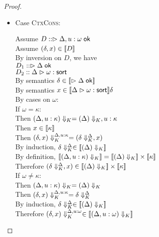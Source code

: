 \begin{proof}
\begin{itemize}
\item Case \textsc{CtxCons}:
  \begin{tabbedproof}
    \oo Assume $D :: \judgeACtx{\Delta, u:\omega}$ \\
    \oo Assume $(\delta, x) \in \interp{D}$ \\
    \ooo By inversion on $D$, we have \\
    \oooo $D_1 :: \judgeACtx{\Delta}$ \\
    \oooo $D_2 :: \judgeSort{\omega}$ \\
    \ooo By semantics $\delta \in \interp{\judgeACtx{\Delta}}$ \\
    \ooo By semantics $x \in \interp{\judgeSort{\omega}}\delta$ \\
    \ooo By cases on $\omega$: \\
    \oooo If $\omega = \kappa$: \\
    \ooooo Then $\restrictkind{\Delta, u:\kappa} = \restrictkind{\Delta}, u:\kappa$ \\
    \ooooo Then $x \in \interp{\kappa}$ \\
    \ooooo Then $\restricttyenv{\Delta, u:\kappa}{(\delta,x)} = 
                (\restricttyenv{\Delta}{\delta}, x)$ \\
    \ooooo By induction, $\restricttyenv{\Delta}{\delta} \in \interp{\restrictkind{\Delta}}$ \\
    \ooooo By definition, $\interp{\restrictkind{\Delta, u:\kappa}} = \interp{\restrictkind{\Delta}} \times \interp{\kappa}$ \\
    \ooooo Therefore $(\restricttyenv{\Delta}{\delta}, x) \in \interp{\restrictkind{\Delta}} \times \interp{\kappa}$ \\
    \oooo If $\omega \not= \kappa$: \\
    \ooooo Then $\restrictkind{\Delta, u:\kappa} = \restrictkind{\Delta}$ \\
    \ooooo Then $\restricttyenv{\Delta, u:\kappa}{(\delta,x)} = 
                \restricttyenv{\Delta}{\delta}$ \\
    \ooooo By induction, $\restricttyenv{\Delta}{\delta} \in \interp{\restrictkind{\Delta}}$ \\
    \ooooo Therefore $\restricttyenv{\Delta, u:\omega}{(\delta, x)} \in \interp{\restrictkind{\Delta, u:\omega}}$ \\
  \end{tabbedproof}
\end{itemize}
\end{proof}

